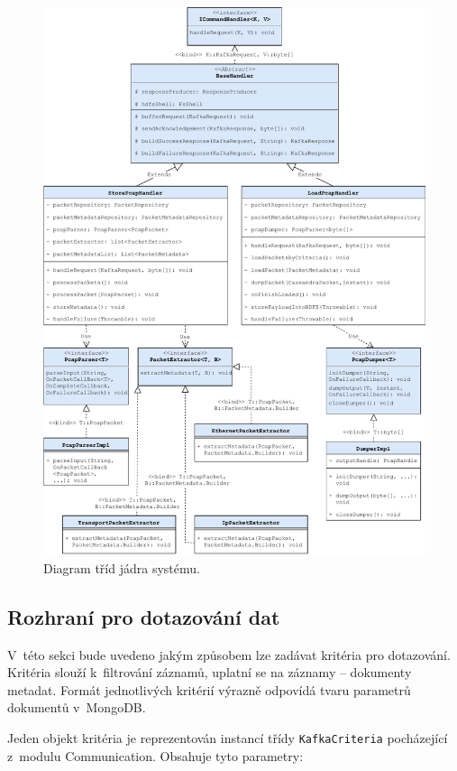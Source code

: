 \begin{figure}[!h]
  \centering
  \includegraphics[width=15cm]{template-fig/DRCoreClassDiagram.pdf}
  \caption{Diagram tříd jádra systému.}
  \label{FIG_DRCoreClassDiagram}
\end{figure}

\subsection{Rozhraní pro dotazování dat} \label{queryDataInterface}
V~této sekci bude uvedeno jakým způsobem lze zadávat kritéria pro dotazování. Kritéria slouží k~filtrování záznamů, uplatní se na záznamy -- dokumenty metadat. Formát jednotlivých kritérií výrazně odpovídá tvaru parametrů dokumentů v~MongoDB.

Jeden objekt kritéria je reprezentován instancí třídy \texttt{KafkaCriteria} pocházející z~modulu Communication. Obsahuje tyto parametry:

